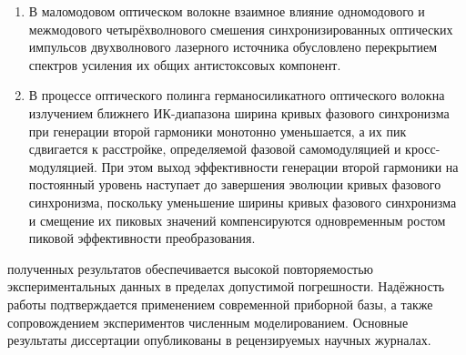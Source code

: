 {}
\begin{enumerate}[beginpenalty=10000] %
  \item В маломодовом оптическом волокне взаимное влияние одномодового и межмодового четырёхволнового смешения синхронизированных оптических импульсов двухволнового лазерного источника обусловлено перекрытием спектров усиления их общих антистоксовых компонент.
  \item В процессе оптического полинга германосиликатного оптического волокна излучением ближнего ИК-диапазона ширина кривых фазового синхронизма при генерации второй гармоники монотонно уменьшается, а их пик сдвигается к расстройке, определяемой фазовой самомодуляцией и кросс-модуляцией. При этом выход эффективности генерации второй гармоники на постоянный уровень наступает до завершения эволюции кривых фазового синхронизма, поскольку уменьшение ширины кривых фазового синхронизма и смещение их пиковых значений компенсируются одновременным ростом пиковой эффективности преобразования.
\end{enumerate}

{\reliability} полученных результатов обеспечивается высокой повторяемостью экспериментальных данных в пределах допустимой погрешности. Надёжность работы подтверждается применением современной приборной базы, а также сопровождением экспериментов численным моделированием. Основные результаты диссертации опубликованы в рецензируемых научных журналах.

\makeatletter
\setcounter{citeregistered}{0}
\makeatother

